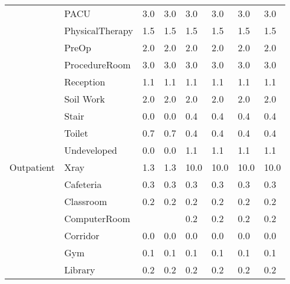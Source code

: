 \begin{center}
\begin{longtable}{p{1.25in}p{1in}p{0.5in}p{0.5in}p{0.5in}p{0.5in}p{0.5in}p{0.5in}}
                                   & PACU                                 & 3.0     & 3.0     & 3.0    & 3.0   & 3.0   & 3.0    \\
                                   & PhysicalTherapy                      & 1.5     & 1.5     & 1.5    & 1.5   & 1.5   & 1.5    \\
                                   & PreOp                                & 2.0     & 2.0     & 2.0    & 2.0   & 2.0   & 2.0    \\
                                   & ProcedureRoom                        & 3.0     & 3.0     & 3.0    & 3.0   & 3.0   & 3.0    \\
                                   & Reception                            & 1.1     & 1.1     & 1.1    & 1.1   & 1.1   & 1.1    \\
                                   & Soil Work                            & 2.0     & 2.0     & 2.0    & 2.0   & 2.0   & 2.0    \\
                                   & Stair                                & 0.0     & 0.0     & 0.4    & 0.4   & 0.4   & 0.4    \\
                                   & Toilet                               & 0.7     & 0.7     & 0.4    & 0.4   & 0.4   & 0.4    \\
                                   & Undeveloped                          & 0.0     & 0.0     & 1.1    & 1.1   & 1.1   & 1.1    \\
Outpatient                         & Xray                                 & 1.3     & 1.3     & 10.0   & 10.0  & 10.0  & 10.0   \\
                                   & Cafeteria                            & 0.3     & 0.3     & 0.3    & 0.3   & 0.3   & 0.3    \\
                                   & Classroom                            & 0.2     & 0.2     & 0.2    & 0.2   & 0.2   & 0.2    \\
                                   & ComputerRoom                         &         &         & 0.2    & 0.2   & 0.2   & 0.2    \\
                                   & Corridor                             & 0.0     & 0.0     & 0.0    & 0.0   & 0.0   & 0.0    \\
                                   & Gym                                  & 0.1     & 0.1     & 0.1    & 0.1   & 0.1   & 0.1    \\
                                   & Library                              & 0.2     & 0.2     & 0.2    & 0.2   & 0.2   & 0.2    \\

\end{longtable}
\end{center}
